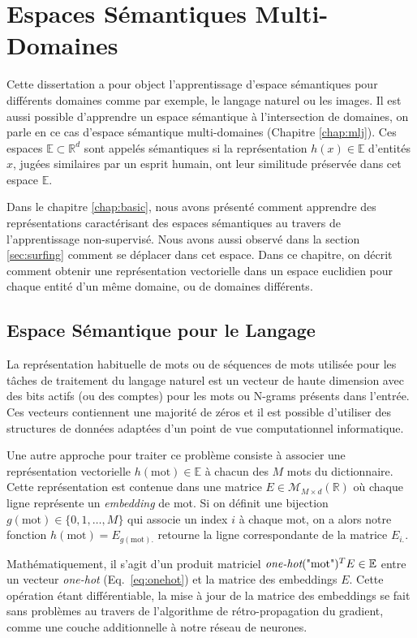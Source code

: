 \chapter{Espaces Sémantiques Multi-Domaines}

Cette dissertation a pour object l'apprentissage d'espace sémantiques pour
différents domaines comme par exemple, le langage naturel ou les images. Il est
aussi possible d'apprendre un espace sémantique à l'intersection de domaines,
on parle en ce cas d'espace sémantique multi-domaines (Chapitre \ref{chap:mlj}). Ces
espaces $\mathbb{E}\subset \mathbb{R}^{d}$ sont appelés sémantiques si la représentation
$h(x)\in \mathbb{E}$ d'entités $x$, jugées similaires par un esprit humain, ont leur
similitude préservée dans cet espace $\mathbb{E}$.

Dans le chapitre \ref{chap:basic}, nous avons présenté comment apprendre des
représentations caractérisant des espaces sémantiques au travers de
l'apprentissage non-supervisé. Nous avons aussi observé dans la section
\ref{sec:surfing} comment se déplacer dans cet espace. Dans ce chapitre, on
décrit comment obtenir une représentation vectorielle dans un espace euclidien
pour chaque entité d'un même domaine, ou de domaines différents.
 
  
\section{Espace Sémantique pour le Langage}

La représentation habituelle de mots ou de séquences de mots utilisée pour les
tâches de traitement du langage naturel est un vecteur de haute dimension avec
des bits actifs (ou des comptes) pour les mots ou N-grams présents dans
l'entrée. Ces vecteurs contiennent une majorité de zéros et il est possible
d'utiliser des structures de données adaptées d'un point de
vue computationnel informatique.

Une autre approche pour traiter ce problème consiste à associer une
représentation vectorielle $h(\textrm{mot})\in\mathbb{E}$ à chacun des $M$ mots
du dictionnaire. Cette représentation est contenue dans une matrice
$E\in\mathcal{M}_{M \times d}(\mathbb{R})$ où chaque ligne représente un {\it
embedding} de mot. Si on définit une bijection $g(\textrm{mot}) \in \lbrace
0,1,\dots, M \rbrace$ qui associe un index $i$ à chaque mot, on a alors notre
fonction $h(\textrm{mot})=E_{g(\textrm{mot}).}$ retourne la ligne
correspondante de la matrice $E_{i.}$.

Mathématiquement, il s'agit d'un produit matriciel
$\textrm{\it one-hot}(\textrm{"mot"})^{T}E\in\mathbb{E}$ entre un vecteur {\it one-hot}
(Eq.~\ref{eq:onehot}) et la matrice des embeddings $E$. Cette opération étant
différentiable, la mise à jour de la matrice des embeddings se fait sans
problèmes au travers de l'algorithme de rétro-propagation du gradient, comme
une couche additionnelle à notre réseau de neurones.

